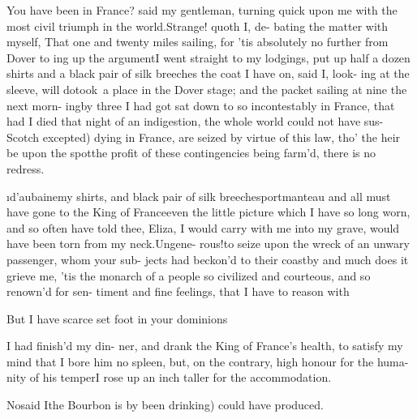 \documentclass[twoside]{article}
\begin{document}
\tsk You have been in France? said 
my gentleman, turning quick upon 
me with the most civil triumph in 
the world.\tsk Strange! quoth I, de-
bating the matter with myself, That 
one and twenty miles sailing, for ’tis 
absolutely no further from Dover to 
ing up the argument\tsk I went straight
to my lodgings, put up half a dozen
shirts and a black pair of silk breeches
\tsk \lqq the coat I have on, said I, look-
ing at the sleeve, will do\rqq\tsk took~a 
place in the Dover stage; and the
packet sailing at nine the next morn-
ing\tsk by three I had got sat down to 
so incontestably in France, that had 
I died that night of an indigestion, 
the whole world could not have sus-
\vfill %
\bgroup\fontsize{9}{12}\selectfont\noindent
{}
Scotch excepted) dying in France, are seized 
by virtue of this law, tho’ the heir be upon 
the spot\tsh the profit of these contingencies 
being farm’d, there is no redress.\par\egroup
{}
\i{d’aubaine}\tsk my shirts, and black pair 
of silk breeches\tsk portmanteau and 
all must have gone to the King of 
France\tsk even the little picture which 
I have so long worn, and so often 
have told thee, Eliza, I would carry 
with me into my grave, would have 
been torn from my neck.\tsk Ungene-
rous!\tsk to seize upon the wreck of an 
unwary passenger, whom your sub-
jects had beckon’d to their coast\tsk by 
and much does it grieve me, ’tis the 
monarch of a people so civilized and 
courteous, and so renown’d for sen-
timent and fine feelings, that I have 
to reason with\tsh

But I have scarce set foot in your\break
dominions\tsh


\vskip 2pt

 I had finish’d my din-
ner, and drank the King\break
of France’s health, to satisfy my mind 
that I bore him no spleen, but, on the
contrary, high honour for the huma-
nity of his temper\tsk I rose up an inch
taller for the accommodation.

\tsk No\tsk said I\tsk the Bourbon is by\break
{}
been drinking) could have produced.
\end{document}
